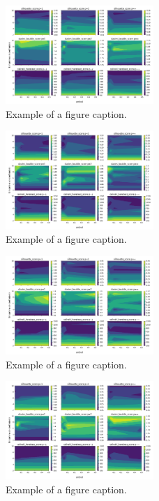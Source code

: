\begin{figure}[htbp]
\centerline{\includegraphics[width=0.5\textwidth]{graficos_experimentos/k_medias/caracteristicos3_pca0.99.png}}
\caption{Example of a figure caption.}
\label{graficos_experimentos/k_medias/caracteristicos3_pca0.99.png}
\end{figure}
 
\begin{figure}[htbp]
\centerline{\includegraphics[width=0.5\textwidth]{graficos_experimentos/k_medias/caracteristicos4_pca0.9.png}}
\caption{Example of a figure caption.}
\label{graficos_experimentos/k_medias/caracteristicos4_pca0.9.png}
\end{figure}
 
\begin{figure}[htbp]
\centerline{\includegraphics[width=0.5\textwidth]{graficos_experimentos/k_medias/caracteristicos4_pca0.95.png}}
\caption{Example of a figure caption.}
\label{graficos_experimentos/k_medias/caracteristicos4_pca0.95.png}
\end{figure}
 
\begin{figure}[htbp]
\centerline{\includegraphics[width=0.5\textwidth]{graficos_experimentos/k_medias/caracteristicos4_pca0.99.png}}
\caption{Example of a figure caption.}
\label{graficos_experimentos/k_medias/caracteristicos4_pca0.99.png}
\end{figure}
